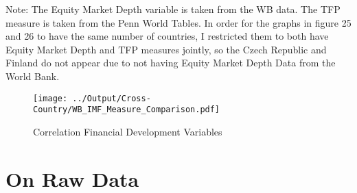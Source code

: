 \documentclass[12pt,notitlepage]{article}
\begin{document}
Note: The Equity Market Depth variable is taken from the WB data.  The TFP measure is taken from the Penn World Tables.  In order for the graphs in figure 25 and 26 to have the same number of countries,  I restricted them to both have Equity Market Depth and TFP measures jointly,  so the Czech Republic and Finland do not appear due to not having Equity Market Depth Data from the World Bank.


\begin{figure}[!htpb]
	\caption{Correlation Financial Development Variables}
	\centering
 	\texttt{[image: ../Output/Cross-Country/WB\_IMF\_Measure\_Comparison.pdf]}
\end{figure}


\clearpage





























\FloatBarrier
\section{On Raw Data} %
\label{sec:rawdata}
\FloatBarrier
\end{document}
